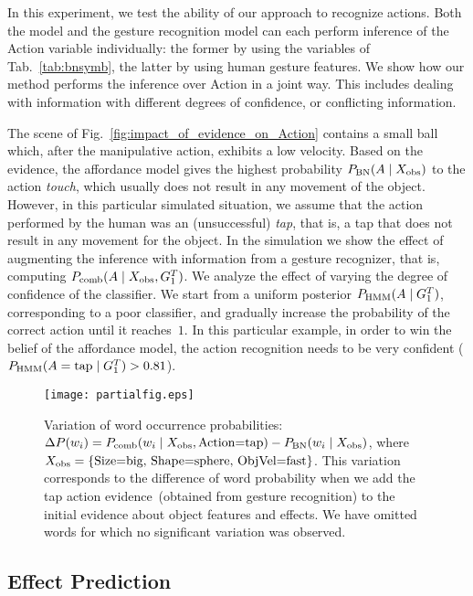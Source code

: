 In this experiment, we test the ability of our approach to recognize actions.
Both the \AffWords{} model and the gesture recognition model can each perform inference of the Action variable individually: the former by using the variables of Tab.~\ref{tab:bnsymb}, the latter by using human gesture features.
We show how our method performs the inference over Action in a joint way.
This includes dealing with information with different degrees of confidence, or conflicting information.

The scene of Fig.~\ref{fig:impact_of_evidence_on_Action} contains a small ball which, after the manipulative action, exhibits a low velocity.
Based on the evidence, the affordance model gives the highest probability $P_{\text{BN}}(A \mid X_\text{obs})$ to the action \emph{touch}, which usually does not result in any movement of the object.
However, in this particular simulated situation, we assume that the action performed by the human was an (unsuccessful) \emph{tap}, that is, a tap that does not result in any movement for the object.
In the simulation we show the effect of augmenting the inference with information from a gesture recognizer, that is, computing $P_\text{comb}(A \mid X_\text{obs},G_1^T)$.
We analyze the effect of varying the degree of confidence of the classifier.
We start from a uniform posterior $P_{\text{HMM}}(A \mid G_1^T)$, corresponding to a poor classifier, and gradually increase the probability of the correct action until it reaches~$1$.
In this particular example, in order to win the belief of the affordance model, the action recognition needs to be very confident ($P_{\text{HMM}}(A=\text{tap} \mid G_1^T) > 0.81$).

\begin{figure}
\centering
\texttt{[image: partialfig.eps]}
\caption{Variation of word occurrence probabilities:
$\Delta P(w_i) = P_\text{comb}(w_i \mid X_\text{obs}, \text{Action=tap}) - P_{\text{BN}}(w_i \mid X_\text{obs})$, where $X_\text{obs} = \{ \text{Size=big, Shape=sphere, ObjVel=fast} \}$.
This variation corresponds to the difference of word probability when we add the tap action evidence~(obtained from gesture recognition) to the initial evidence about object features and effects. We have omitted words for which no significant variation was observed.}
\label{fig:probdiff}
\end{figure}

\subsection{Effect Prediction}
\label{sec:results:inference_effects}

